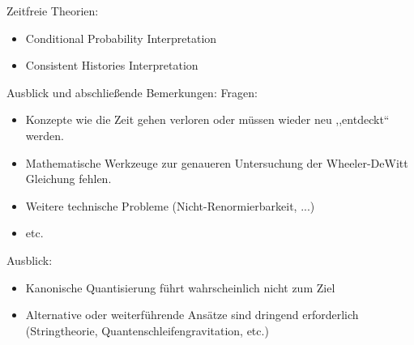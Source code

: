 \documentclass[mathserif]{beamer}
\theoremstyle{definition}
\begin{document}
	\begin{frame}{Zeitfreie Theorien:}
		\begin{itemize}
			\item Conditional Probability Interpretation
			\item Consistent Histories Interpretation
		\end{itemize}
	\end{frame}
	\begin{frame}{Ausblick und abschließende Bemerkungen:}
		Fragen:
		\begin{itemize}
			\item Konzepte wie die Zeit gehen verloren oder müssen wieder neu ,,entdeckt`` werden.
			\item Mathematische Werkzeuge zur genaueren Untersuchung der Wheeler-DeWitt Gleichung fehlen.
			\item Weitere technische Probleme (Nicht-Renormierbarkeit, ...)
			\item etc.
		\end{itemize}
		\pause
		Ausblick:
		\begin{itemize}
			\item Kanonische Quantisierung führt wahrscheinlich nicht zum Ziel
			\item Alternative oder weiterführende Ansätze sind dringend erforderlich (Stringtheorie, Quantenschleifengravitation, etc.)
		\end{itemize}
	\end{frame}
\end{document}

